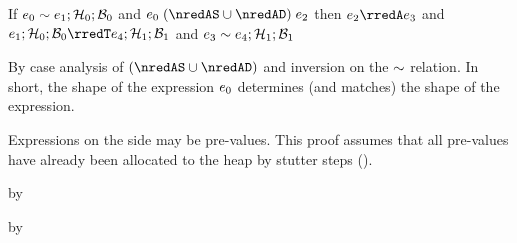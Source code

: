 \begin{lemma}\label{AT-A-step}
  If\/ $e_0 \sim e_1; \mathcal{H}_0; \mathcal{B}_0$
  and\/ $\sexpr_0 \nredAX \sexpr_2$
  then\/ $\sexpr_2 \rredA \sexpr_3$
  and\/ $\conf{\sexpr_1}{\vstore_0}{\bstore_0} \rredT \conf{\sexpr_4}{\vstore_1}{\bstore_1}$
  and\/ $e_3 \sim e_4; \mathcal{H}_1; \mathcal{B}_1$
\end{lemma}
\begin{lamportproof}
  By case analysis of $\nredAX$ and inversion on the $\sim$ relation.
  In short, the shape of the \Aname{} expression $e_0$ determines
   (and matches) the shape of the \Tname{} expression.

  Expressions on the \Tname{} side may be pre-values.
  This proof assumes that all pre-values have already been allocated to the
   heap by stutter steps ().

    \begin{pfproof}
      \qedstep
        \begin{pfproof}
          by 
        \end{pfproof}
    \end{pfproof}

    \begin{pfproof}
      \qedstep
        \begin{pfproof}
          by 
        \end{pfproof}
    \end{pfproof}


\end{lamportproof}
